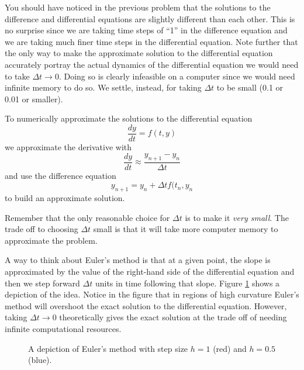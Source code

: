 You should have noticed in the previous problem that the solutions to the difference and
differential equations are slightly different than each other.  This is no surprise since
we are taking time steps of ``1'' in the difference equation and we are taking much finer
time steps in the differential equation.  Note further that the only way to make the
approximate solution to the differential equation accurately portray the actual dynamics
of the differential equation we would need to take $\Delta t \to 0$.  Doing so is clearly
infeasible on a computer since we would need infinite memory to do so.  We settle,
instead, for taking $\Delta t$ to be small (0.1 or 0.01 or smaller).  

\begin{definition}
    To numerically approximate the solutions to the differential equation
    \[ \frac{dy}{dt} = f(t,y) \]
    we approximate the derivative with 
    \[ \frac{dy}{dt} \approx \frac{y_{n+1} - y_n}{\Delta t} \]
    and use the difference equation
    \[ y_{n+1} = y_n + \Delta t f(t_n,y_n  \]
    to build an approximate solution.  
\end{definition}
Remember that the only reasonable choice for
$\Delta t$ is to make it {\it very small}.  The trade off to choosing $\Delta t$ small
is that it will take more computer memory to approximate the problem.

A way to think about Euler's method is that at a given point, the slope is approximated by
the value of the right-hand side of the differential equation and then we step forward
$\Delta t$
units in time following that slope.  Figure \ref{fig:Euler} shows a depiction of the idea.
Notice in the figure that in regions of high curvature Euler's method will overshoot the
exact solution to the differential equation.  However, taking $\Delta t \to 0$ theoretically
gives the exact solution at the trade off of needing infinite computational resources.

\begin{figure}[ht!]
    \begin{center}
    \end{center}
    \caption{A depiction of Euler's method with step size $h=1$ (red) and $h=0.5$ (blue).}
    \label{fig:Euler}
\end{figure}


